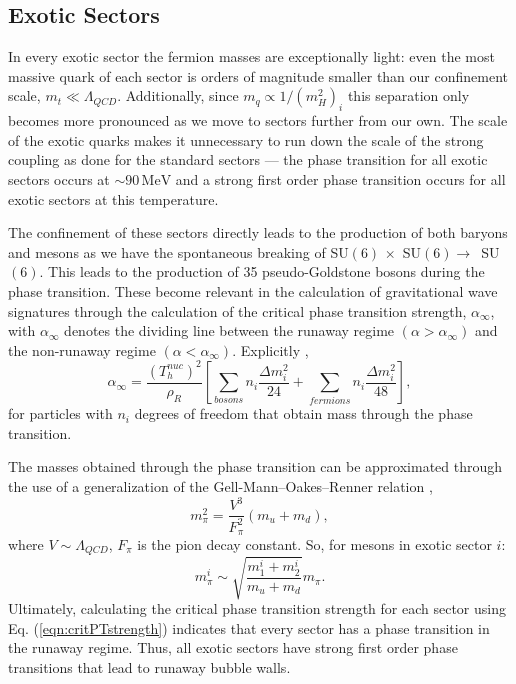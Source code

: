 \documentclass[nofootinbib,twocolumn,preprintnumbers]{revtex4-2}
\begin{document}
\subsection{Exotic Sectors}

In every exotic sector the fermion masses are exceptionally light: even the most massive quark of each sector is orders of magnitude smaller than our confinement scale, $m_t \ll \Lambda_{QCD}$. Additionally, since $m_q \propto 1/(m^2_H)_i$ this separation only becomes more pronounced as we move to sectors further from our own. The scale of the exotic quarks makes it unnecessary to run down the scale of the strong coupling as done for the standard sectors --- the phase transition for all exotic sectors occurs at $\sim 90 \,\mathrm{MeV}$ and a strong first order phase transition occurs for all exotic sectors at this temperature. 

The confinement of these sectors directly leads to the production of both baryons and mesons as we have the spontaneous breaking of SU$(6) \,\times$ SU$(6) \rightarrow\,$ SU$(6)$. This leads to the production of 35 pseudo-Goldstone bosons during the phase transition. These become relevant in the calculation of gravitational wave signatures through the calculation of the critical phase transition strength, $\alpha_{\infty}$, with $\alpha_{\infty}$ denotes the dividing line between the runaway regime  $(\alpha >\alpha_{\infty})$ and the non-runaway regime $(\alpha <\alpha_{\infty})$. Explicitly \cite{Breitbach:2018ddu, Caprini:2015zlo, Espinosa:2010hh}, 
\begin{equation}\label{eqn:critPTstrength}
\alpha_{\infty} = \frac{(T^{nuc}_h)^2}{\rho_R}\left[\sum_{bosons} n_i\frac{\Delta m^2_i}{24} + \sum_{fermions} n_i\frac{\Delta m_i^2}{48}\right],
\end{equation} 
for particles with $n_i$ degrees of freedom that obtain mass through the phase transition. 

The masses obtained through the phase transition can be approximated through the use of a generalization of the Gell-Mann--Oakes--Renner relation \cite{Schwartz:2013pla},
\begin{equation}\label{eqn:gmor}
m^2_{\pi} = \frac{V^3}{F^2_{\pi}}(m_u + m_d),
\end{equation}
where $V \sim \Lambda_{QCD}$, $F_\pi$ is the pion decay constant. So, for mesons in exotic sector $i$:
\begin{equation}
m_{\pi}^i \sim \sqrt{\frac{m_1^i+m_2^i}{m_u + m_d}} m_{\pi}.
\end{equation}
Ultimately, calculating the critical phase transition strength for each sector using Eq. (\ref{eqn:critPTstrength}) indicates that every sector has a phase transition in the runaway regime. Thus, all exotic sectors have strong first order phase transitions that lead to runaway bubble walls.
\end{document}
